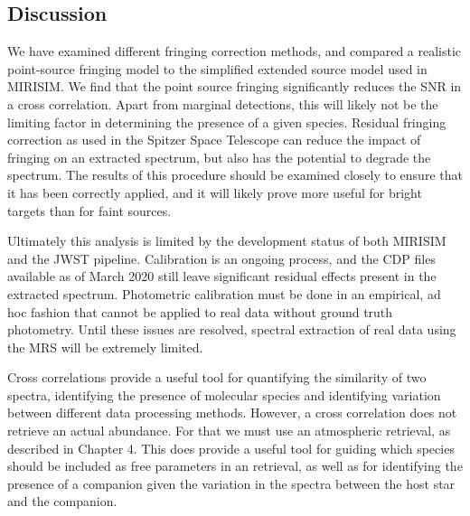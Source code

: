 \subsection{Discussion}
We have examined different fringing correction methods, and compared a realistic point-source fringing model to the simplified extended source model used in MIRISIM.
We find that the point source fringing significantly reduces the SNR in a cross correlation. 
Apart from marginal detections, this will likely not be the limiting factor in determining the presence of a given species.
Residual fringing correction as used in the Spitzer Space Telescope can reduce the impact of fringing on an extracted spectrum, but also has the potential to degrade the spectrum.
The results of this procedure should be examined closely to ensure that it has been correctly applied, and it will likely prove more useful for bright targets than for faint sources. 

Ultimately this analysis is limited by the development status of both MIRISIM and the JWST pipeline. 
Calibration is an ongoing process, and the CDP files available as of March 2020 still leave significant residual effects present in the extracted spectrum.
Photometric calibration must be done in an empirical, ad hoc fashion that cannot be applied to real data without ground truth photometry.
Until these issues are resolved, spectral extraction of real data using the MRS will be extremely limited.

Cross correlations provide a useful tool for quantifying the similarity of two spectra, identifying the presence of molecular species and identifying variation between different data processing methods.
However, a cross correlation does not retrieve an actual abundance.
For that we must use an atmospheric retrieval, as described in Chapter 4.
This does provide a useful tool for guiding which species should be included as free parameters in an retrieval, as well as for identifying the presence of a companion given the variation in the spectra between the host star and the companion.